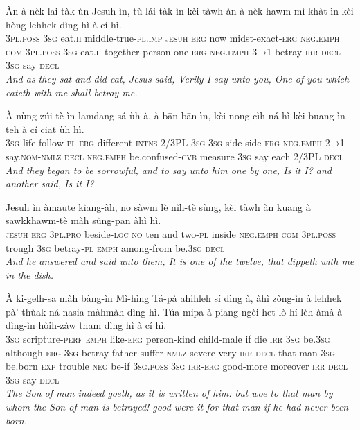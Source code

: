 \documentclass[11pt,a4paper]{article}
\begin{document}
\begin{exe}
\gll Àn à nèk lai-tàk-ùn Jesuh ìn, tù lái-tàk-ìn kèi tàwh àn à nèk-hawm mì khàt ìn kèi hòng lehhek dìng hì à cí hì. \\
     \textsc{3pl}.\textsc{poss} \textsc{3sg} eat.\textsc{ii} middle-true-\textsc{pl}.\textsc{imp} \textsc{jesuh} \textsc{erg} now midst-exact-\textsc{erg} \textsc{neg}.\textsc{emph} \textsc{com} \textsc{3pl}.\textsc{poss} \textsc{3sg} eat.\textsc{ii}-together person one \textsc{erg} \textsc{neg}.\textsc{emph} \textsc{3→1} betray \textsc{irr} \textsc{decl} \textsc{3sg} say \textsc{decl} \\
\glt \textcolor{kjvcolor}{\textit{And as they sat and did eat, Jesus said, Verily I say unto you, One of you which eateth with me shall betray me.}}

\gll À nùng-zúi-tè ìn lamdang-sá ùh à, à bān-bān-ìn, kèi nong cìh-ná hì kèi buang-ìn teh à cí ciat ùh hì. \\
     \textsc{3sg} life-follow-\textsc{pl} \textsc{erg} different-\textsc{intns} 2/3PL \textsc{3sg} \textsc{3sg} side-side-\textsc{erg} \textsc{neg}.\textsc{emph} \textsc{2→1} say.\textsc{nom}-\textsc{nmlz} \textsc{decl} \textsc{neg}.\textsc{emph} be.confused-\textsc{cvb} measure \textsc{3sg} say each 2/3PL \textsc{decl} \\
\glt \textcolor{kjvcolor}{\textit{And they began to be sorrowful, and to say unto him one by one, Is it I? and another said, Is it I?}}

\gll Jesuh ìn àmaute kìang-àh, no sàwm lè nìh-tè sùng, kèi tàwh àn kuang à sawkkhawm-tè màh sùng-pan àhì hì. \\
     \textsc{jesuh} \textsc{erg} \textsc{3pl}.\textsc{pro} beside-\textsc{loc} \textsc{no} ten and two-\textsc{pl} inside \textsc{neg}.\textsc{emph} \textsc{com} \textsc{3pl}.\textsc{poss} trough \textsc{3sg} betray-\textsc{pl} \textsc{emph} among-from be.\textsc{3sg} \textsc{decl} \\
\glt \textcolor{kjvcolor}{\textit{And he answered and said unto them, It is one of the twelve, that dippeth with me in the dish.}}

\gll À ki-gelh-sa màh bàng-ìn Mì-hìng Tá-pà ahihleh sí dìng à, àhì zòng-ìn à lehhek pà' thùak-ná nasia màhmàh dìng hì. Túa mipa à piang ngèi het lò hí-lèh àmà à dìng-ìn hòih-zàw tham dìng hì à cí hì. \\
     \textsc{3sg} scripture-\textsc{perf} \textsc{emph} like-\textsc{erg} person-kind child-male if die \textsc{irr} \textsc{3sg} be.\textsc{3sg} although-\textsc{erg} \textsc{3sg} betray father suffer-\textsc{nmlz} severe very \textsc{irr} \textsc{decl} that man \textsc{3sg} be.born \textsc{exp} trouble \textsc{neg} be-if \textsc{3sg}.\textsc{poss} \textsc{3sg} \textsc{irr}-\textsc{erg} good-more moreover \textsc{irr} \textsc{decl} \textsc{3sg} say \textsc{decl} \\
\glt \textcolor{kjvcolor}{\textit{The Son of man indeed goeth, as it is written of him: but woe to that man by whom the Son of man is betrayed! good were it for that man if he had never been born.}}


\end{exe}
\end{document}
